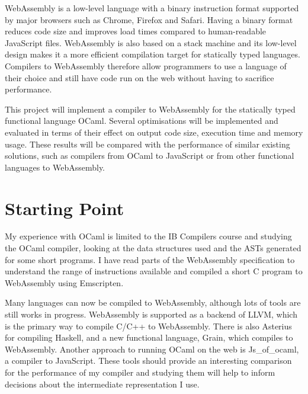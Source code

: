 \documentclass[12pt]{article}
\begin{document}
WebAssembly is a low-level language with a binary instruction format supported by major browsers such as Chrome, Firefox and Safari. Having a binary format reduces code size and improves load times compared to human-readable JavaScript files. WebAssembly is also based on a stack machine and its low-level design makes it a more efficient compilation target for statically typed languages. Compilers to WebAssembly therefore allow programmers to use a language of their choice and still have code run on the web without having to sacrifice performance.

This project will implement a compiler to WebAssembly for the statically typed functional language OCaml. Several optimisations will be implemented and evaluated in terms of their effect on output code size, execution time and memory usage. These results will be compared with the performance of similar existing solutions, such as compilers from OCaml to JavaScript or from other functional languages to WebAssembly.



\section*{Starting Point}
My experience with OCaml is limited to the IB Compilers course and studying the OCaml compiler, looking at the data structures used and the ASTs generated for some short programs. I have read parts of the WebAssembly specification
to understand the range of instructions available and compiled a short C program to WebAssembly using Emscripten. %

Many languages can now be compiled to WebAssembly, although lots of tools are still works in progress. %
WebAssembly is supported as a backend of LLVM, which is the primary way to compile C/C++ to WebAssembly. There is also Asterius for compiling Haskell, and a new functional language, Grain, which compiles to WebAssembly. Another approach to running OCaml on the web is Js\_of\_ocaml, %
 a compiler to JavaScript. These tools should provide an interesting comparison for the performance of my compiler and studying them will help to inform decisions about the intermediate representation I use.
\end{document}
